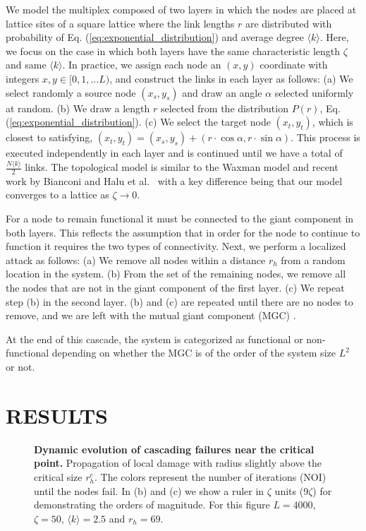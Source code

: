 \documentclass[twocolumn,noshowpacs,pre,preprintnumbers,superscriptaddress,amsmath,amssymb,floatfix]{revtex4}
\newcommand{\kk}{\langle k \rangle}
\begin{document}
	We model the multiplex composed of two layers in which the nodes are placed at lattice sites of a square lattice where the link lengths $r$ are distributed with probability of Eq. (\ref{eq:exponential_distribution}) and average degree $\kk$. 
	Here, we focus on the case in which both layers have the same characteristic length $\zeta$ and same $\kk$. 
	In practice, we assign each node an $(x,y)$ coordinate with integers $x,y \in [0,1,...L)$, and construct the links in each layer as follows:
	(a) We select randomly a source node $(x_s,y_s)$ and draw an angle $\alpha$ selected uniformly at random.
	(b) We draw a length $r$ selected from the distribution $P(r)$, Eq. (\ref{eq:exponential_distribution}).
	(c) We select the target node $(x_t,y_t)$, which is closest to satisfying, $(x_t,y_t) = (x_s,y_s) + (r\cdot \cos\alpha,r\cdot \sin\alpha)$.
	This process is executed independently in each layer and is continued until we have a total of $\frac{N\kk}{2}$ links.
	The topological model is similar to the Waxman model \cite{waxman-ieee1988} and recent work by Bianconi and Halu et al.~\cite{bianconi-pre2013,halu-pre2014} with a key difference being that our model converges to a lattice as $\zeta\to 0$.
	
	For a node to remain functional it must be connected to the giant component in both layers. 
	This reflects the assumption that in order for the node to continue to function it requires the two types of connectivity.
	Next, we perform a localized attack as follows:
	(a) We remove all nodes within a distance $r_h$ from a random location in the system.
	(b) From the set of the remaining nodes, we remove all the nodes that are not in the giant component of the first layer.
	(c) We repeat step (b) in the second layer.
	(b) and (c) are repeated until there are no nodes to remove, and we are left with the mutual giant component (MGC) \cite{buldyrev-nature2010,gao-naturephysics2012,bianconi-pre2015,cellai-pre2016}.
	
	At the end of this cascade, the system is categorized as functional or non-functional depending on whether the MGC is of the order of the system size $L^2$ or not.
	
	\section{RESULTS}
	
	\begin{figure*}
		\centering
		\hfil
		\hfil
		\caption{\textbf{Dynamic evolution of cascading failures near the critical point.} 
			Propagation of local damage with radius slightly above the critical size $r_h^c$. The colors represent the number of iterations (NOI) until the nodes fail. In (b) and (c) we show a ruler in $\zeta$ units (9$\zeta$) for demonstrating the orders of magnitude.
			For this figure $L = 4000$, $\zeta = 50$, $\kk = 2.5$ and $r_h = 69$.}
		\label{fig:age}	
	\end{figure*}
	
\end{document}
